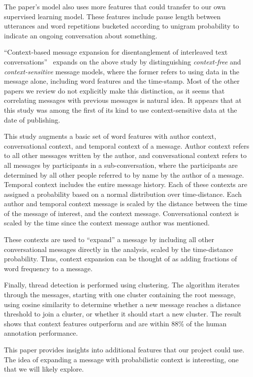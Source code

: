 \documentclass[11pt]{article}
\newcommand{\titlecite}[2]{``#1''~\cite{#2}}
\begin{document}
The paper's model also uses more features that could transfer to
our own supervised learning model. These features include pause length
between utterances and word repetitions bucketed according to unigram
probability to indicate an ongoing conversation about something.

\titlecite{Context-based message expansion for disentanglement of interleaved 
text conversations}{Wang2009b} expands on the above study by distinguishing
\textit{context-free} and \textit{context-sensitive} message models, where the 
former refers to using data in the message alone, including word features and the
time-stamp. Most of the other papers we review do not explicitly make this 
distinction, as it seems that correlating messages with previous messages is 
natural idea. It appears that at this study was among the first of its 
kind to use context-sensitive data at the date of publishing.

This study augments a basic set of word features with author context, 
conversational context, and temporal context of a message. Author context 
refers to all other messages written by the author, and conversational context 
refers to all messages by participants in a sub-conversation, 
where the participants are determined by all other people referred to by name 
by the author of a message. Temporal context includes the entire message 
history. Each of these contexts are assigned a probability based on a normal 
distribution over time-distance. Each author and temporal context message is 
scaled by the distance between the time of the message of interest, and the 
context message. Conversational context is scaled by the time since the 
context message author was mentioned.

These contexts are used to ``expand'' a message by including all other 
conversational messages directly in the analysis, scaled by the time-distance 
probability. Thus, context expansion can be thought of as adding fractions of 
word frequency to a message.

Finally, thread detection is performed using clustering. The algorithm iterates 
through the messages, starting with one cluster containing the root message, 
using cosine similarity to determine whether a new message reaches a distance 
threshold to join a cluster, or whether it should start a new cluster. The 
result shows that context features outperform \cite{Elsner2008a} and
are within 88\% of the human annotation performance.

This paper provides insights into additional features that our project could 
use. The idea of expanding a message with probabilistic context is 
interesting, one that we will likely explore.
\end{document}
